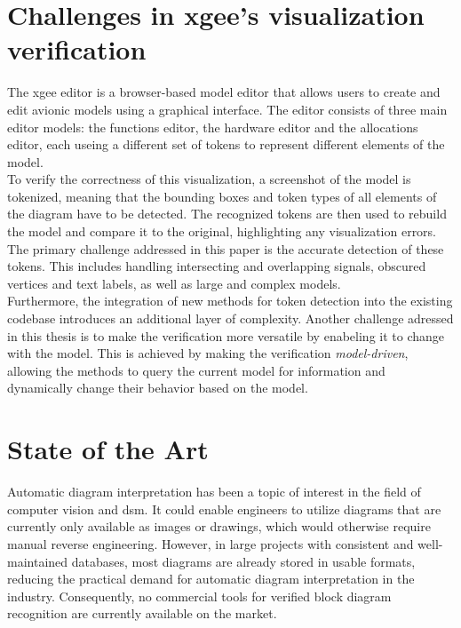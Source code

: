\section{Challenges in \acrshort{xgee}'s visualization verification}
\label{sec:challenges_xgee_visualization_verification}
The \acrshort{xgee} editor is a browser-based model editor that allows users to create and edit avionic models using a graphical interface. The editor consists of three main editor models: the functions editor, the hardware editor and the allocations editor, each useing a different set of tokens to represent different elements of the model.\\
To verify the correctness of this visualization, a screenshot of the model is tokenized, meaning that the bounding boxes and token types of all elements of the diagram have to be detected. The recognized tokens are then used to rebuild the model and compare it to the original, highlighting any visualization errors.\\
The primary challenge addressed in this paper is the accurate detection of these tokens. This includes handling intersecting and overlapping signals, obscured vertices and text labels, as well as large and complex models.\\
Furthermore, the integration of new methods for token detection into the existing codebase introduces an additional layer of complexity. 
Another challenge adressed in this thesis is to make the verification more versatile by enabeling it to change with the model. This is achieved by making the verification \textit{model-driven}, allowing the methods to query the current model for information and dynamically change their behavior based on the model.

\section{State of the Art}
\label{sec:state_of_the_art}
Automatic diagram interpretation has been a topic of interest in the field of computer vision and \acrshort{dsm}. It could enable engineers to utilize diagrams that are currently only available as images or drawings, which would otherwise require manual reverse engineering. However, in large projects with consistent and well-maintained databases, most diagrams are already stored in usable formats, reducing the practical demand for automatic diagram interpretation in the industry. Consequently, no commercial tools for verified block diagram recognition are currently available on the market.


